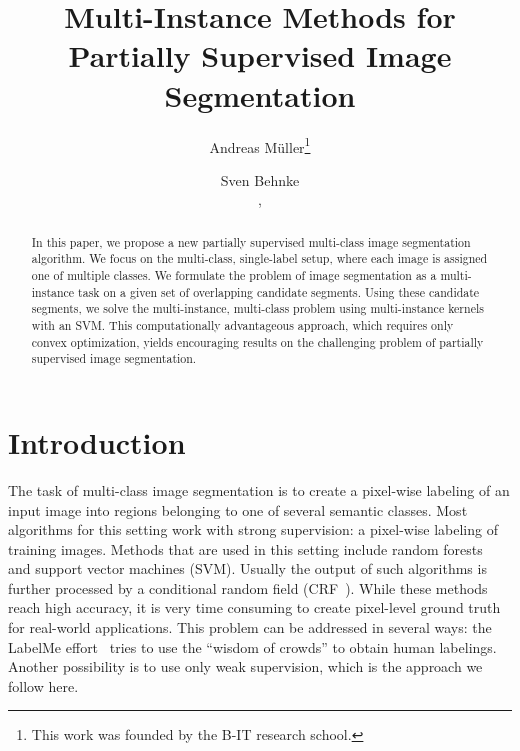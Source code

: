 \documentclass{llncs} %
\begin{document}
\mainmatter              %

\title{Multi-Instance Methods for Partially Supervised Image
Segmentation}

\author{Andreas M\"uller\thanks{This work was founded by the B-IT research
school.}  \and Sven Behnke\\ ,
} 

\maketitle

\begin{abstract}
In this paper, we propose a new partially supervised multi-class image segmentation algorithm.
We focus on the multi-class, single-label setup, where each image is assigned
one of multiple classes. 
We formulate the problem of image segmentation as a multi-instance task on a given
set of overlapping candidate segments. Using these candidate segments, we solve the multi-instance, multi-class problem
using multi-instance kernels with an SVM\@. This computationally advantageous approach, which requires only convex optimization,
yields encouraging results on the challenging problem of partially supervised image segmentation.
\end{abstract}

\section{Introduction}
The task of multi-class image segmentation is to create a pixel-wise labeling of an input image
into regions belonging to one of several semantic classes.
Most algorithms for this setting work with strong supervision: a pixel-wise labeling
of training images. Methods that are used in this setting include random forests~\citep{schroff2008object} and support vector machines (SVM). Usually
the output of such algorithms is further processed by a conditional random field (CRF~\citep{ladicky2009associative,gonfaus2010harmony,jiang2009efficient}).
While these methods reach high accuracy, it is very time consuming to create
pixel-level ground truth for real-world applications.
This problem can be addressed in several ways:
the LabelMe effort~\citep{russell2008labelme} tries to use the ``wisdom of crowds'' to obtain human labelings.
Another possibility is to use only weak supervision, which is the approach we follow here.
\end{document}
